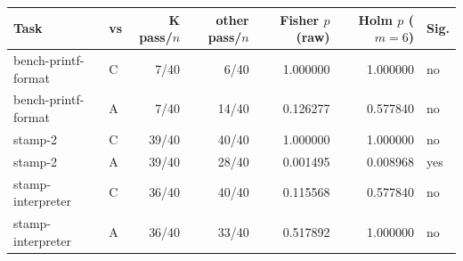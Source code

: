 \begin{tabular}{llrrrrl}
\toprule
Task & vs & K pass/$n$ & other pass/$n$ & Fisher $p$ (raw) & Holm $p$ ($m=6$) & Sig. \\
\midrule
bench-printf-format & C & 7/40 & 6/40 & 1.000000 & 1.000000 & no \\
bench-printf-format & A & 7/40 & 14/40 & 0.126277 & 0.577840 & no \\
stamp-2 & C & 39/40 & 40/40 & 1.000000 & 1.000000 & no \\
stamp-2 & A & 39/40 & 28/40 & 0.001495 & 0.008968 & yes \\
stamp-interpreter & C & 36/40 & 40/40 & 0.115568 & 0.577840 & no \\
stamp-interpreter & A & 36/40 & 33/40 & 0.517892 & 1.000000 & no \\
\bottomrule
\end{tabular}
